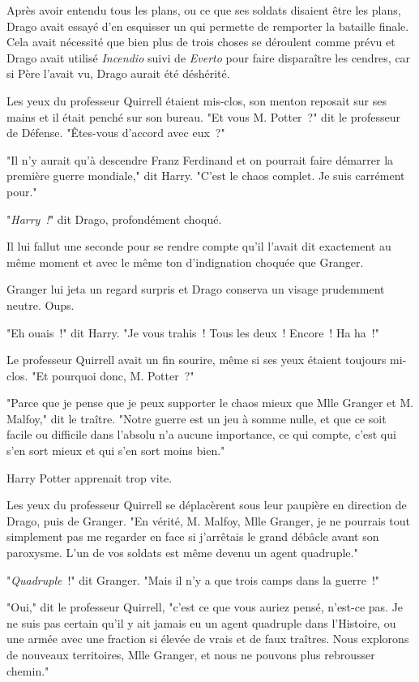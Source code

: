 Après avoir entendu tous les plans, ou ce que ses soldats disaient être les plans, Drago avait essayé d'en esquisser un qui permette de remporter la bataille finale. Cela avait nécessité que bien plus de trois choses se déroulent comme prévu et Drago avait utilisé \emph{Incendio} suivi de \emph{Everto} pour faire disparaître les cendres, car si Père l'avait vu, Drago aurait été déshérité.

Les yeux du professeur Quirrell étaient mis-clos, son menton reposait sur ses mains et il était penché sur son bureau. "Et vous M. Potter~?" dit le professeur de Défense. "Êtes-vous d'accord avec eux~?"

"Il n'y aurait qu'à descendre Franz Ferdinand et on pourrait faire démarrer la première guerre mondiale," dit Harry. "C'est le chaos complet. Je suis carrément pour."

"\emph{Harry~!}" dit Drago, profondément choqué.

Il lui fallut une seconde pour se rendre compte qu'il l'avait dit exactement au même moment et avec le même ton d'indignation choquée que Granger.

Granger lui jeta un regard surpris et Drago conserva un visage prudemment neutre. Oups.

"Eh ouais~!" dit Harry. "Je vous trahis~! Tous les deux~! Encore~! Ha ha~!"

Le professeur Quirrell avait un fin sourire, même si ses yeux étaient toujours mi-clos. "Et pourquoi donc, M. Potter~?"

"Parce que je pense que je peux supporter le chaos mieux que Mlle Granger et M. Malfoy," dit le traître. "Notre guerre est un jeu à somme nulle, et que ce soit facile ou difficile dans l'absolu n'a aucune importance, ce qui compte, c'est qui s'en sort mieux et qui s'en sort moins bien."

Harry Potter apprenait trop vite.

Les yeux du professeur Quirrell se déplacèrent sous leur paupière en direction de Drago, puis de Granger. "En vérité, M. Malfoy, Mlle Granger, je ne pourrais tout simplement pas me regarder en face si j'arrêtais le grand débâcle avant son paroxysme. L'un de vos soldats est même devenu un agent quadruple."

"\emph{Quadruple}~!" dit Granger. "Mais il n'y a que trois camps dans la guerre~!"

"Oui," dit le professeur Quirrell, "c'est ce que vous auriez pensé, n'est-ce pas. Je ne suis pas certain qu'il y ait jamais eu un agent quadruple dans l'Histoire, ou une armée avec une fraction si élevée de vrais et de faux traîtres. Nous explorons de nouveaux territoires, Mlle Granger, et nous ne pouvons plus rebrousser chemin."

